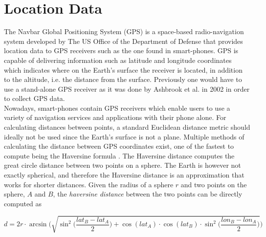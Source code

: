 \section{Location Data}
The Navbar Global Positioning System (GPS) is a space-based radio-navigation system developed by The US Office of the Department of Defense \cite{gps-navstar} that provides location data to GPS receivers such as the one found in smart-phones. GPS is capable of delivering information such as latitude and longitude coordinates which indicates where on the Earth's surface the receiver is located, in addition to the altitude, i.e. the distance from the surface. Previously one would have to use a stand-alone GPS receiver as it was done by Ashbrook et al.  in 2002 \cite{using_gps_to_learn_significant_locations} in order to collect GPS data.\\

Nowadays, smart-phones contain GPS receivers which enable users to use a variety of navigation services and applications with their phone alone. For calculating distances between points, a standard Euclidean distance metric should ideally not be used since the Earth's surface is not a plane. Multiple methods of calculating the distance between GPS coordinates exist, one of the fastest to compute being the Haversine formula \cite{haversine-formula}. The Haversine distance computes the great circle distance between two points on a sphere. The Earth is however not exactly spherical, and therefore the Haversine distance is an approximation that works for shorter distances. Given the radius of a sphere $r$ and two points on the sphere, $A$ and $B$, the \textit{haversine distance} between the two points can be directly computed as 

\begin{equation}
\label{eq:haversine}
d = 2r \cdot \arcsin \Bigg( \sqrt{\sin^2 \bigg( \frac{lat_B - lat_A}{2} \bigg) + \cos(lat_A) \cdot \cos(lat_B) \cdot \sin^2 \bigg(\frac{ lon_B - lon_A}{2} \bigg)}\Bigg)
\end{equation}


